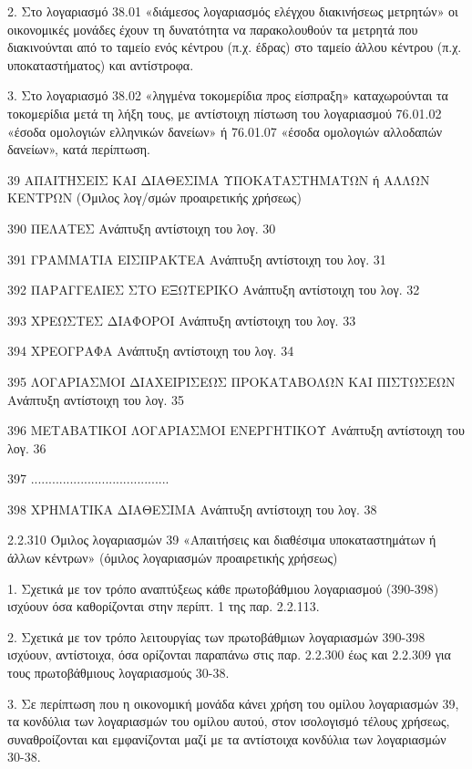 \documentclass[A4,10pt,greek]{book}
\begin{document}
2. Στο λογαριασμό 38.01 «διάμεσος λογαριασμός ελέγχου διακινήσεως μετρητών» οι οικονομικές μονάδες έχουν τη δυνατότητα να παρακολουθούν τα μετρητά που διακινούνται από το ταμείο ενός κέντρου (π.χ. έδρας) στο ταμείο άλλου κέντρου (π.χ. υποκαταστήματος) και αντίστροφα.

3. Στο λογαριασμό 38.02 «ληγμένα τοκομερίδια προς είσπραξη» καταχωρούνται τα τοκομερίδια μετά τη λήξη τους, με αντίστοιχη πίστωση του λογαριασμού 76.01.02 «έσοδα ομολογιών ελληνικών δανείων» ή 76.01.07 «έσοδα ομολογιών αλλοδαπών δανείων», κατά περίπτωση.

 39   ΑΠΑΙΤΗΣΕΙΣ ΚΑΙ ΔΙΑΘΕΣΙΜΑ ΥΠΟΚΑΤΑΣΤΗΜΑΤΩΝ ή ΑΛΛΩΝ
        ΚΕΝΤΡΩΝ (Όμιλος λογ/σμών προαιρετικής χρήσεως)

       390   ΠΕΛΑΤΕΣ
                Ανάπτυξη αντίστοιχη του λογ. 30

       391   ΓΡΑΜΜΑΤΙΑ ΕΙΣΠΡΑΚΤΕΑ
                Ανάπτυξη αντίστοιχη του λογ. 31

       392   ΠΑΡΑΓΓΕΛΙΕΣ ΣΤΟ ΕΞΩΤΕΡΙΚΟ
                Ανάπτυξη αντίστοιχη του λογ. 32

       393   ΧΡΕΩΣΤΕΣ ΔΙΑΦΟΡΟΙ
                Ανάπτυξη αντίστοιχη του λογ. 33

       394   ΧΡΕΟΓΡΑΦΑ
                Ανάπτυξη αντίστοιχη του λογ. 34

       395    ΛΟΓΑΡΙΑΣΜΟΙ ΔΙΑΧΕΙΡΙΣΕΩΣ ΠΡΟΚΑΤΑΒΟΛΩΝ
                ΚΑΙ ΠΙΣΤΩΣΕΩΝ
                Ανάπτυξη αντίστοιχη του λογ. 35

       396   ΜΕΤΑΒΑΤΙΚΟΙ ΛΟΓΑΡΙΑΣΜΟΙ ΕΝΕΡΓΗΤΙΚΟΥ
                Ανάπτυξη αντίστοιχη του λογ. 36

       397   .......................................

       398   ΧΡΗΜΑΤΙΚΑ ΔΙΑΘΕΣΙΜΑ
                Ανάπτυξη αντίστοιχη του λογ. 38

2.2.310 Όμιλος λογαριασμών 39 «Απαιτήσεις και διαθέσιμα υποκαταστημάτων ή άλλων κέντρων» (όμιλος λογαριασμών προαιρετικής χρήσεως)

1. Σχετικά με τον τρόπο αναπτύξεως κάθε πρωτοβάθμιου λογαριασμού (390-398) ισχύουν όσα καθορίζονται στην περίπτ. 1 της παρ. 2.2.113.

2. Σχετικά με τον τρόπο λειτουργίας των πρωτοβάθμιων λογαριασμών 390-398 ισχύουν, αντίστοιχα, όσα ορίζονται παραπάνω στις παρ. 2.2.300 έως και 2.2.309 για τους πρωτοβάθμιους λογαριασμούς 30-38.

3. Σε περίπτωση που η οικονομική μονάδα κάνει χρήση του ομίλου λογαριασμών 39, τα κονδύλια των λογαριασμών του ομίλου αυτού, στον ισολογισμό τέλους χρήσεως, συναθροίζονται και εμφανίζονται μαζί με τα αντίστοιχα κονδύλια των λογαριασμών 30-38.
\end{document}
